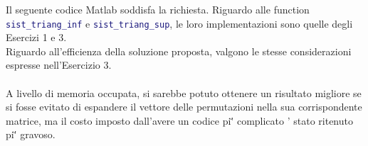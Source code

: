 \begin{center}
\footnotesize\noindent{}\end{center}

\noindent Il seguente codice Matlab soddisfa la richiesta. Riguardo alle function \lstinline[language=Matlab]{sist_triang_inf} e \lstinline[language=Matlab]{sist_triang_sup}, le loro implementazioni sono quelle degli Esercizi 1 e 3.
\\



\noindent Riguardo all'efficienza della soluzione proposta, valgono le stesse considerazioni espresse nell'Esercizio 3.
\\
\\
\noindent  A livello di memoria occupata, si sarebbe potuto ottenere un risultato migliore se si fosse evitato di espandere il vettore delle permutazioni nella sua corrispondente matrice, ma il costo imposto dall'avere un codice pi\u' complicato \e' stato ritenuto pi\u' gravoso.
